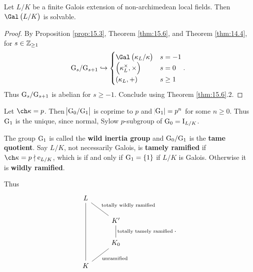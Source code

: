 
\begin{corollary}
Let $ L / K $ be a finite Galois extension of non-archimedean local fields. Then $ \Gal\br{L / K} $ is solvable.
\end{corollary}

\begin{proof}
By Proposition \ref{prop:15.3}, Theorem \ref{thm:15.6}, and Theorem \ref{thm:14.4}, for $ s \in \mathbb{Z}_{\ge 1} $
$$ \G_s / \G_{s + 1} \hookrightarrow
\begin{cases}
\Gal\br{\kappa_L / \kappa} & s = -1 \\
\br{\kappa_L^\times, \times} & s = 0 \\
\br{\kappa_L, +} & s \ge 1
\end{cases}.
$$
Thus $ \mathrm{G}_s / \mathrm{G}_{s + 1} $ is abelian for $ s \ge -1 $. Conclude using Theorem \ref{thm:15.6}.$ 2 $.
\end{proof}

Let $ \ch \kappa = p $. Then $ \abs{\mathrm{G}_0 / \mathrm{G}_1} $ is coprime to $ p $ and $ \abs{\mathrm{G}_1} = p^n $ for some $ n \ge 0 $. Thus $ \mathrm{G}_1 $ is the unique, since normal, Sylow $ p $-subgroup of $ \mathrm{G}_0 = \mathrm{I}_{L / K} $.

\begin{definition}
The group $ \mathrm{G}_1 $ is called the \textbf{wild inertia group} and $ \mathrm{G}_0 / \mathrm{G}_1 $ is the \textbf{tame quotient}. Say $ L / K $, not necessarily Galois, is \textbf{tamely ramified} if $ \ch \kappa = p \nmid \e_{L / K} $, which is if and only if $ \G_1 = \cbr{1} $ if $ L / K $ is Galois. Otherwise it is \textbf{wildly ramified}.
\end{definition}

Thus
$$
\begin{tikzcd}
L \arrow[dash]{dr}{\text{totally wildly ramified}} \arrow[dash]{ddd} & \\
& K' \arrow[dash]{d}{\text{totally tamely ramified}} \\
& K_0 \arrow[dash]{dl}{\text{unramified}} \\
K &
\end{tikzcd}.
$$

\pagebreak

